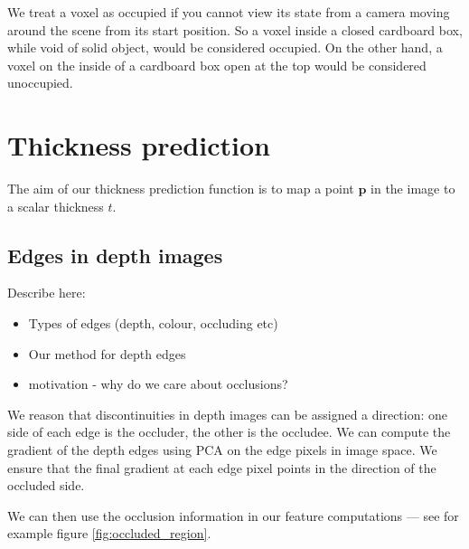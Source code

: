 \documentclass[10pt,twocolumn,letterpaper]{article}
\newcommand{\point}{\mathbf{p}}
\begin{document}
We treat a voxel as occupied if you cannot view its state from a camera moving around the scene from its start position.
So a voxel inside a closed cardboard box, while void of solid object, would be considered occupied.
On the other hand, a voxel on the inside of a cardboard box open at the top would be considered unoccupied.

\section{Thickness prediction}

The aim of our thickness prediction function is to map a point $\point$ in the image to a scalar thickness $t$.


\subsection{Edges in depth images}
Describe here:
\begin{itemize}
\item Types of edges (depth, colour, occluding etc)
\item Our method for depth edges
\item motivation - why do we care about occlusions?
\end{itemize}

We reason that discontinuities in depth images can be assigned a direction: one side of each edge is the occluder, the other is the occludee. 
We can compute the gradient of the depth edges using PCA on the edge pixels in image space.
We ensure that the final gradient at each edge pixel points in the direction of the occluded side.

We can then use the occlusion information in our feature computations --- see for example figure \ref{fig:occluded_region}.
\end{document}
